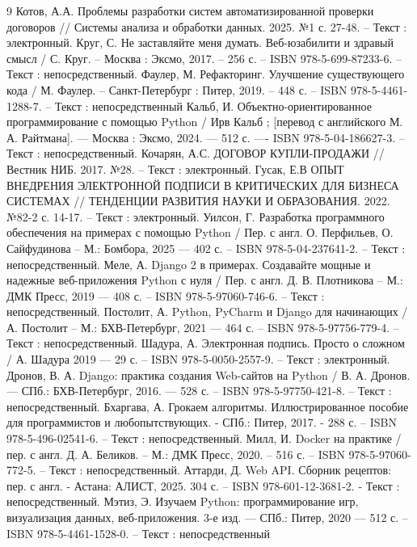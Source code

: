 \begin{thebibliography}{9}
     Котов, А.А. Проблемы разработки систем автоматизированной проверки договоров // Системы анализа и обработки данных. 2025. №1 с. 27-48. – Текст : электронный.
     Круг, С. Не заставляйте меня думать. Веб-юзабилити и здравый смысл / С. Круг. – Москва : Эксмо, 2017. – 256 с. – ISBN 978-5-699-87233-6. – Текст : непосредственный.
     Фаулер, М. Рефакторинг. Улучшение существующего кода / М. Фаулер. – Санкт-Петербург : Питер, 2019. – 448 с. – ISBN 978-5-4461-1288-7. – Текст : непосредственный
     Кальб, И. Объектно-ориентированное программирование с помощью Python / Ирв Кальб ; [перевод с английского М. А. Райтмана]. — Москва : Эксмо, 2024. — 512 с. —- ISBN 978-5-04-186627-3. – Текст : непосредственный.
     Кочарян, А.С. ДОГОВОР КУПЛИ-ПРОДАЖИ // Вестник НИБ. 2017. №28. – Текст : электронный.
     Гусак, Е.В  ОПЫТ ВНЕДРЕНИЯ ЭЛЕКТРОННОЙ ПОДПИСИ В КРИТИЧЕСКИХ ДЛЯ БИЗНЕСА СИСТЕМАХ // ТЕНДЕНЦИИ РАЗВИТИЯ НАУКИ И ОБРАЗОВАНИЯ. 2022. №82-2 с. 14-17. – Текст : электронный.
     Уилсон, Г. Разработка программного обеспечения на примерах с помощью Python / Пер. с англ. О. Перфильев, О. Сайфудинова – М.: Бомбора, 2025 — 402 с. – ISBN 978-5-04-237641-2. – Текст : непосредственный.
     Меле, А. Django 2 в примерах. Создавайте мощные и надежные веб-приложения Python с нуля / Пер. с англ. Д. В. Плотникова – М.: ДМК Пресс, 2019 — 408 с. – ISBN 978-5-97060-746-6. – Текст : непосредственный.
     Постолит, А. Python, PyCharm и Django для начинающих / А. Постолит – М.: БХВ-Петербург, 2021 — 464 с. – ISBN 978-5-97756-779-4. – Текст : непосредственный.
     Шадура, А. Электронная подпись. Просто о сложном / А. Шадура 2019 — 29 с. – ISBN 978-5-0050-2557-9. – Текст : электронный.
     Дронов, В. А. Django: практика создания Web-сайтов на Python / В. А. Дронов. — СПб.: БХВ-Петербург, 2016. — 528 с. – ISBN 978-5-97750-421-8. – Текст : непосредственный.
     Бхаргава, А. Грокаем алгоритмы. Иллюстрированное пособие для программистов и любопытствующих. - СПб.: Питер, 2017. - 288 с. – ISBN 978-5-496-02541-6. – Текст : непосредственный.
     Милл, И. Docker на практике / пер. с англ. Д. А. Беликов. – М.: ДМК Пресс, 2020. – 516 с. – ISBN 978-5-97060-772-5. – Текст : непосредственный.
     Аттарди, Д. Web API. Сборник рецептов: пер. с англ. - Астана: АЛИСТ, 2025. 304 с. – ISBN 978-601-12-3681-2. - Текст : непосредственный.
     Мэтиз, Э. Изучаем Python: программирование игр, визуализация данных, веб-приложения. 3-е изд. — СПб.: Питер, 2020 — 512 с. – ISBN 978-5-4461-1528-0. – Текст : непосредственный

\end{thebibliography}
